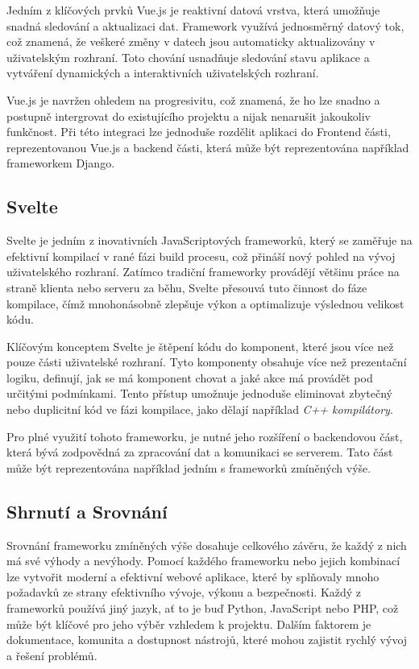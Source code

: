Jedním z klíčových prvků Vue.js je reaktivní datová vrstva, která umožňuje snadná sledování a aktualizaci dat. Framework využívá jednosměrný datový tok, což znamená, že veškeré změny v datech jsou automaticky aktualizovány v uživatelským rozhraní. Toto chování usnadňuje sledování stavu aplikace a vytváření dynamických a interaktivních uživatelských rozhraní.

Vue.js je navržen ohledem na progresivitu, což znamená, že ho lze snadno a postupně intergrovat do existujícího projektu a nijak nenarušit jakoukoliv funkčnost. Při této integraci lze jednoduše rozdělit aplikaci do Frontend části, reprezentovanou Vue.js a backend části, která může být reprezentována například frameworkem Django. \cite{about_vuejs}

\subsection{Svelte}
\label{subsec:dev-framework-svelte}
Svelte je jedním z inovativních JavaScriptových frameworků, který se zaměřuje na efektivní kompilací v rané fázi build procesu, což přináší nový pohled na vývoj uživatelského rozhraní. Zatímco tradiční frameworky provádějí většinu práce na straně klienta nebo serveru za běhu, Svelte přesouvá tuto činnost do fáze kompilace, čímž mnohonásobně zlepšuje výkon a optimalizuje výslednou velikost kódu.

Klíčovým konceptem Svelte je štěpení kódu do komponent, které jsou více než pouze části uživatelské rozhraní. Tyto komponenty obsahuje více než prezentační logiku, definují, jak se má komponent chovat a jaké akce má provádět pod určitými podmínkami. Tento přístup umožnuje jednoduše eliminovat zbytečný nebo duplicitní kód ve fázi kompilace, jako dělají například \textit{C++ kompilátory}.

Pro plné využití tohoto frameworku, je nutné jeho rozšíření o backendovou část, která bývá zodpovědná za zpracování dat a komunikaci se serverem. Tato část může být reprezentována například jedním s frameworků zmíněných výše. \cite{about_svelte}

\subsection{Shrnutí a Srovnání}
\label{subsec:dev-framework-comparison}
Srovnání frameworku zmíněných výše dosahuje celkového závěru, že každý z nich má své výhody a nevýhody. Pomocí každého frameworku nebo jejich kombinací lze vytvořit moderní a efektivní webové aplikace, které by splňovaly mnoho požadavků ze strany efektivního vývoje, výkonu a bezpečnosti.
Každý z frameworků používá jiný jazyk, ať to je buď Python, JavaScript nebo PHP, což může být klíčové pro jeho výběr vzhledem k projektu. Dalším faktorem je dokumentace, komunita a dostupnost nástrojů, které mohou zajistit rychlý vývoj a řešení problémů.

